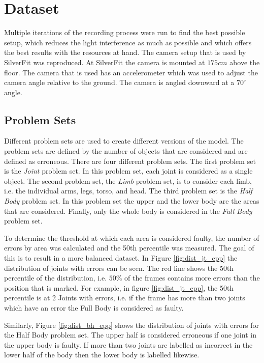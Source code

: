 \section{Dataset}
\label{sec:dataset}

Multiple iterations of the recording process were run to find the best possible setup, which reduces the light interference as much as possible and which offers the best results with the resources at hand. The camera setup that is used by SilverFit was reproduced. At SilverFit the camera is mounted at $175cm$ above the floor. The camera that is used has an accelerometer which was used to adjust the camera angle relative to the ground. The camera is angled downward at a $70^\circ$ angle. 

\subsection{Problem Sets}
\label{sec:problem_set}

Different problem sets are used to create different versions of the model. The problem sets are defined by the number of objects that are considered and are defined as erroneous. There are four different problem sets. The first problem set is the \textit{Joint} problem set. In this problem set, each joint is considered as a single object. The second problem set,  the \textit{Limb} problem set, is to consider each limb, i.e. the individual arms, legs, torso, and head. The third problem set is the \textit{Half Body} problem set. In this problem set the upper and the lower body are the areas that are considered. Finally, only the whole body is considered in the \textit{Full Body} problem set.

To determine the threshold at which each area is considered faulty, the number of errors by area was calculated and the 50th percentile was measured. The goal of this is to result in a more balanced dataset. In Figure \ref{fig:dist_jt_epp} the distribution of joints with errors can be seen. The red line shows the 50th percentile of the distribution, i.e. $50\%$ of the frames contains more errors than the position that is marked. For example, in figure \ref{fig:dist_jt_epp}, the 50th percentile is at 2 Joints with errors, i.e. if the frame has more than two joints which have an error the Full Body is considered as faulty.

Similarly, Figure \ref{fig:dist_bh_epp} shows the distribution of joints with errors for the Half Body problem set. The upper half is considered erroneous if one joint in the upper body is faulty. If more than two joints are labelled as incorrect in the lower half of the body then the lower body is labelled likewise.

